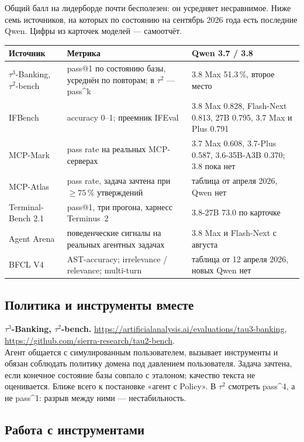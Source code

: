 \documentclass[11pt,a4paper]{article}
\begin{document}
Общий балл на лидерборде почти бесполезен: он усредняет несравнимое.
Ниже семь источников, на которых по состоянию на сентябрь 2026 года
есть последние Qwen. Цифры из карточек моделей --- самоотчёт.

\begin{tabular}{@{}p{3.3cm}p{5.4cm}p{5.3cm}@{}}
\toprule
\textbf{Источник} & \textbf{Метрика} & \textbf{Qwen 3.7 / 3.8} \\
\midrule
$\tau^3$-Banking, $\tau^2$-bench & pass@1 по состоянию базы, усреднён
по повторам; в $\tau^2$ --- pass\textasciicircum k & 3.8 Max 51.3\,\%,
второе место \\[0.3em]
IFBench & accuracy 0--1; преемник IFEval & 3.8 Max 0.828, Flash-Next
0.813, 27B 0.795, 3.7 Max и Plus 0.791 \\[0.3em]
MCP-Mark & pass rate на реальных MCP-серверах & 3.7 Max 0.608,
3.7-Plus 0.587, 3.6-35B-A3B 0.370; 3.8 пока нет \\[0.3em]
MCP-Atlas & pass rate, задача зачтена при $\geq 75\,\%$ утверждений &
таблица от апреля 2026, Qwen нет \\[0.3em]
Terminal-Bench 2.1 & pass@1, три прогона, харнесс Terminus~2 & 3.8-27B
73.0 по карточке \\[0.3em]
Agent Arena & поведенческие сигналы на реальных агентных задачах &
3.8 Max и Flash-Next с августа \\[0.3em]
BFCL V4 & AST-accuracy; irrelevance / relevance; multi-turn & таблица
от 12 апреля 2026, новых Qwen нет \\
\bottomrule
\end{tabular}

\subsection{Политика и инструменты вместе}

\textbf{$\tau^3$-Banking, $\tau^2$-bench.}
\url{https://artificialanalysis.ai/evaluations/tau3-banking},
\url{https://github.com/sierra-research/tau2-bench}.\\
Агент общается с симулированным пользователем, вызывает инструменты
и обязан соблюдать политику домена под давлением пользователя. Задача
зачтена, если конечное состояние базы совпало с эталоном; качество
текста не оценивается. Ближе всего к постановке «агент с Policy».
В $\tau^2$ смотреть pass\textasciicircum 4, а не pass\textasciicircum 1:
разрыв между ними --- нестабильность.

\subsection{Работа с инструментами}
\end{document}
